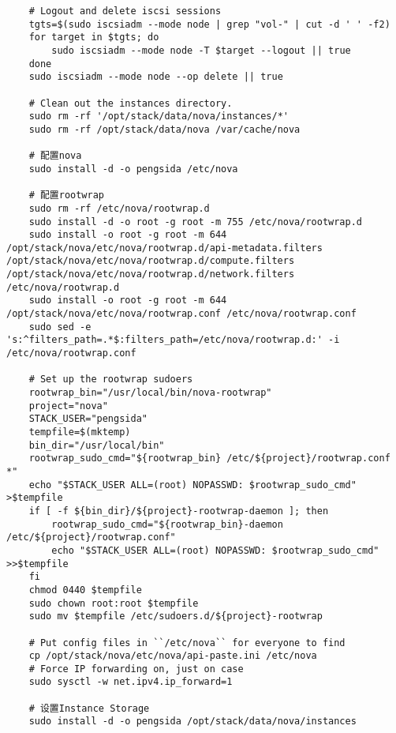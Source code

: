 \documentclass[a4paper,left=1.5cm,right=1.5cm,11pt]{article}
\begin{document}
\begin{lstlisting}
	# Logout and delete iscsi sessions
	tgts=$(sudo iscsiadm --mode node | grep "vol-" | cut -d ' ' -f2)
	for target in $tgts; do
		sudo iscsiadm --mode node -T $target --logout || true
	done
	sudo iscsiadm --mode node --op delete || true
	
	# Clean out the instances directory.
	sudo rm -rf '/opt/stack/data/nova/instances/*'
	sudo rm -rf /opt/stack/data/nova /var/cache/nova

	# 配置nova
	sudo install -d -o pengsida /etc/nova
	
	# 配置rootwrap
	sudo rm -rf /etc/nova/rootwrap.d
	sudo install -d -o root -g root -m 755 /etc/nova/rootwrap.d
	sudo install -o root -g root -m 644 /opt/stack/nova/etc/nova/rootwrap.d/api-metadata.filters /opt/stack/nova/etc/nova/rootwrap.d/compute.filters /opt/stack/nova/etc/nova/rootwrap.d/network.filters /etc/nova/rootwrap.d
	sudo install -o root -g root -m 644 /opt/stack/nova/etc/nova/rootwrap.conf /etc/nova/rootwrap.conf
	sudo sed -e 's:^filters_path=.*$:filters_path=/etc/nova/rootwrap.d:' -i /etc/nova/rootwrap.conf
	
	# Set up the rootwrap sudoers
	rootwrap_bin="/usr/local/bin/nova-rootwrap"
	project="nova"
	STACK_USER="pengsida"
	tempfile=$(mktemp)
	bin_dir="/usr/local/bin"
    rootwrap_sudo_cmd="${rootwrap_bin} /etc/${project}/rootwrap.conf *"
    echo "$STACK_USER ALL=(root) NOPASSWD: $rootwrap_sudo_cmd" >$tempfile
	if [ -f ${bin_dir}/${project}-rootwrap-daemon ]; then
        rootwrap_sudo_cmd="${rootwrap_bin}-daemon /etc/${project}/rootwrap.conf"
        echo "$STACK_USER ALL=(root) NOPASSWD: $rootwrap_sudo_cmd" >>$tempfile
    fi
	chmod 0440 $tempfile
    sudo chown root:root $tempfile
    sudo mv $tempfile /etc/sudoers.d/${project}-rootwrap

	# Put config files in ``/etc/nova`` for everyone to find
	cp /opt/stack/nova/etc/nova/api-paste.ini /etc/nova
	# Force IP forwarding on, just on case
	sudo sysctl -w net.ipv4.ip_forward=1

	# 设置Instance Storage
	sudo install -d -o pengsida /opt/stack/data/nova/instances


\end{lstlisting}
\end{document}
